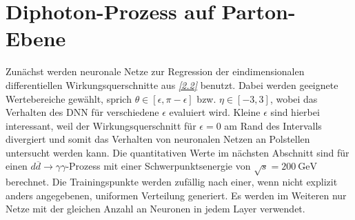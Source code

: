 \section{Diphoton-Prozess auf Parton-Ebene}
\label{4.1}
Zunächst werden neuronale Netze zur Regression der eindimensionalen differentiellen Wirkungsquerschnitte aus \textit{\autoref{2.2}} benutzt. Dabei werden geeignete Wertebereiche gewählt, sprich $\theta \in [\epsilon, \pi - \epsilon]$ bzw. $\eta \in [-3, 3]$, wobei das Verhalten des DNN für verschiedene $\epsilon$ evaluiert wird. Kleine $\epsilon$ sind hierbei interessant, weil der Wirkungsquerschnitt für $\epsilon = 0$ am Rand des Intervalls divergiert und somit das Verhalten von neuronalen Netzen an Polstellen untersucht werden kann. Die quantitativen Werte im nächsten Abschnitt sind für einen $d\overline{d} \rightarrow \gamma \gamma$-Prozess mit einer Schwerpunktsenergie von $\sqrt{s} = 200~\text{GeV}$ berechnet. Die Trainingspunkte werden zufällig nach einer, wenn nicht explizit anders angegebenen, uniformen Verteilung generiert.  
Es werden im Weiteren nur Netze mit der gleichen Anzahl an Neuronen in jedem Layer verwendet.

